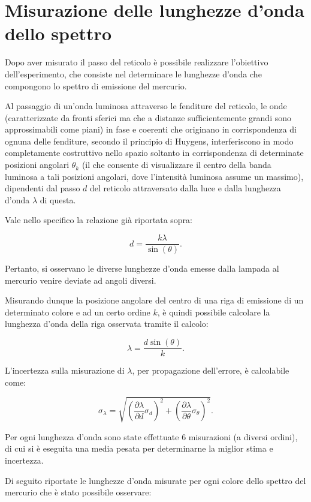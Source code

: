 \documentclass[a4paper,12pt]{article}
\begin{document}
\section{Misurazione delle lunghezze d’onda dello spettro}

Dopo aver misurato il passo del reticolo è possibile realizzare l’obiettivo dell’esperimento, che consiste nel determinare le lunghezze d’onda che compongono lo spettro di emissione del mercurio.

Al passaggio di un’onda luminosa attraverso le fenditure del reticolo, le onde (caratterizzate da fronti sferici ma che a distanze sufficientemente grandi sono approssimabili come piani) in fase e coerenti che originano in corrispondenza di ognuna delle fenditure, secondo il principio di Huygens, interferiscono in modo completamente costruttivo nello spazio soltanto in corrispondenza di determinate posizioni angolari \( \theta_k \) (il che consente di visualizzare il centro della banda luminosa a tali posizioni angolari, dove l’intensità luminosa assume un massimo), dipendenti dal passo \( d \) del reticolo attraversato dalla luce e dalla lunghezza d’onda \( \lambda \) di questa.

Vale nello specifico la relazione già riportata sopra:

\[
d = \frac{k\lambda}{\sin(\theta)}.
\]

Pertanto, si osservano le diverse lunghezze d’onda emesse dalla lampada al mercurio venire deviate ad angoli diversi.

Misurando dunque la posizione angolare del centro di una riga di emissione di un determinato colore e ad un certo ordine \( k \), è quindi possibile calcolare la lunghezza d’onda della riga osservata tramite il calcolo:

\[
\lambda = \frac{d \sin(\theta)}{k}.
\]

L’incertezza sulla misurazione di \( \lambda \), per propagazione dell’errore, è calcolabile come:

\[
\sigma_\lambda = \sqrt{\left(\frac{\partial \lambda}{\partial d} \sigma_d\right)^2 + \left(\frac{\partial \lambda}{\partial \theta} \sigma_\theta\right)^2}.
\]

Per ogni lunghezza d’onda sono state effettuate 6 misurazioni (a diversi ordini), di cui si è eseguita una media pesata per determinarne la miglior stima e incertezza.

Di seguito riportate le lunghezze d’onda misurate per ogni colore dello spettro del mercurio che è stato possibile osservare:
\end{document}
